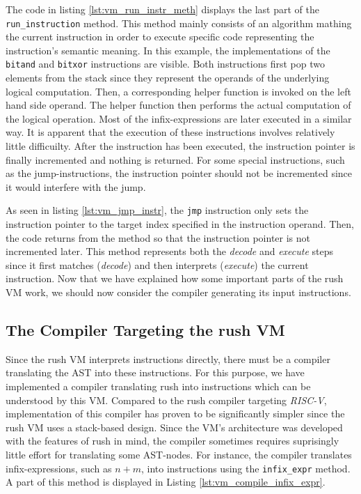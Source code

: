 The code in listing \ref{lst:vm_run_instr_meth} displays the last part of the \texttt{run\_instruction} method.
This method mainly consists of an algorithm mathing the current instruction in order to execute specific code representing the instruction's semantic meaning.
In this example, the implementations of the \texttt{bitand} and \texttt{bitxor} instructions are visible.
Both instructions first pop two elements from the stack since they represent the operands of the underlying logical computation.
Then, a corresponding helper function is invoked on the left hand side operand.
The helper function then performs the actual computation of the logical operation.
Most of the infix-expressions are later executed in a similar way.
It is apparent that the execution of these instructions involves relatively little difficuilty.
After the instruction has been executed, the instruction pointer is finally incremented and nothing is returned.
For some special instructions, such as the jump-instructions, the instruction pointer should not be incremented since it would interfere with the jump.


As seen in listing \ref{lst:vm_jmp_instr}, the \texttt{jmp} instruction only sets the instruction pointer to the target index specified in the instruction operand.
Then, the code returns from the method so that the instruction pointer is not incremented later.
This method represents both the \emph{decode} and \emph{execute} steps since it first matches (\emph{decode}) and then interprets (\emph{execute}) the current instruction.
Now that we have explained how some important parts of the rush VM work, we should now consider the compiler generating its input instructions.

\subsection{The Compiler Targeting the rush VM}

Since the rush VM interprets instructions directly, there must be a compiler translating the AST into these instructions.
For this purpose, we have implemented a compiler translating rush into instructions which can be understood by this VM.
Compared to the rush compiler targeting \emph{RISC-V},
implementation of this compiler has proven to be significantly simpler since the rush VM uses a stack-based design.
Since the VM's architecture was developed with the features of rush in mind,
the compiler sometimes requires suprisingly little effort for translating some AST-nodes. 
For instance, the compiler translates infix-expressions, such as $n + m$, into instructions using the \texttt{infix\_expr} method.
A part of this method is displayed in Listing \ref{lst:vm_compile_infix_expr}.

